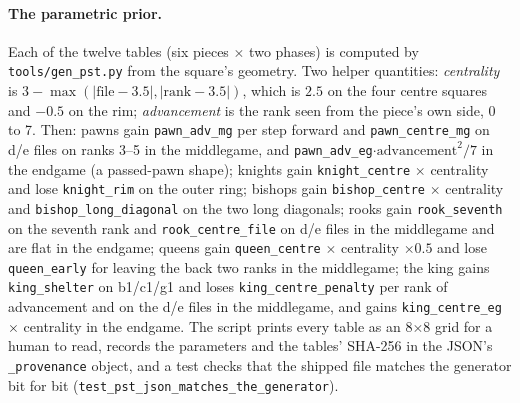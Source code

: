\documentclass[11pt,a4paper]{article}
\newcommand{\code}[1]{\texttt{#1}}
\begin{document}
\paragraph{The parametric prior.} Each of the twelve tables (six pieces $\times$ two phases) is computed
by \code{tools/gen\_pst.py} from the square's geometry. Two helper quantities: \emph{centrality} is
$3 - \max(|\mathrm{file} - 3.5|, |\mathrm{rank} - 3.5|)$, which is $2.5$ on the four centre squares and
$-0.5$ on the rim; \emph{advancement} is the rank seen from the piece's own side, 0 to 7. Then: pawns gain
\code{pawn\_adv\_mg} per step forward and \code{pawn\_centre\_mg} on d/e files on ranks 3--5 in the
middlegame, and \code{pawn\_adv\_eg}$\cdot \mathrm{advancement}^2/7$ in the endgame (a passed-pawn shape);
knights gain \code{knight\_centre} $\times$ centrality and lose \code{knight\_rim} on the outer ring;
bishops gain \code{bishop\_centre} $\times$ centrality and \code{bishop\_long\_diagonal} on the two long
diagonals; rooks gain \code{rook\_seventh} on the seventh rank and \code{rook\_centre\_file} on d/e files
in the middlegame and are flat in the endgame; queens gain \code{queen\_centre} $\times$ centrality
$\times 0.5$ and lose \code{queen\_early} for leaving the back two ranks in the middlegame; the king gains
\code{king\_shelter} on b1/c1/g1 and loses \code{king\_centre\_penalty} per rank of advancement and on the
d/e files in the middlegame, and gains \code{king\_centre\_eg} $\times$ centrality in the endgame. The
script prints every table as an 8$\times$8 grid for a human to read, records the parameters and the
tables' SHA-256 in the JSON's \code{\_provenance} object, and a test checks that the shipped file matches
the generator bit for bit (\code{test\_pst\_json\_matches\_the\_generator}).
\end{document}

